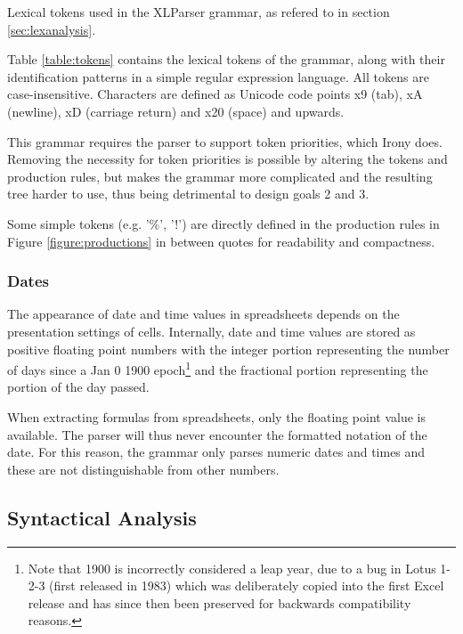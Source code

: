 \begin{table}
\tiny
\centerfloat

\caption{Lexical tokens used in the XLParser grammar, as refered to in section \ref{sec:lexanalysis}.}
\label{table:tokens}
\end{table}

Table \ref{table:tokens} contains the lexical tokens of the grammar, along with their identification patterns in a simple regular expression language. All tokens are case-insensitive.
Characters are defined as Unicode code points x9 (tab), xA (newline), xD (carriage return) and x20 (space) and upwards.

This grammar requires the parser to support token priorities, which Irony does.
Removing the necessity for token priorities is possible by altering the tokens and production rules, but makes the grammar more complicated and the resulting tree harder to use, thus being detrimental to design goals 2 and 3.

Some simple tokens (e.g. '\%', '!') are directly defined in the production rules in Figure \ref{figure:productions} in between quotes for readability and compactness.

\subsubsection{\textbf{Dates}}

The appearance of date and time values in spreadsheets depends on the presentation settings of cells. Internally, date and time values are stored as positive floating point numbers with the integer portion representing the number of days since a Jan 0 1900 epoch\footnote{Note that 1900 is incorrectly considered a leap year, due to a bug in Lotus 1-2-3 (first released in 1983) which was deliberately copied into the first Excel release and has since then been preserved for backwards compatibility reasons.} and the fractional portion representing the portion of the day passed.

When extracting formulas from spreadsheets, only the floating point value is available.
The parser will thus never encounter the formatted notation of the date.
For this reason, the grammar only parses numeric dates and times and these are not distinguishable from other numbers.

\newpage

\subsection{Syntactical Analysis}

